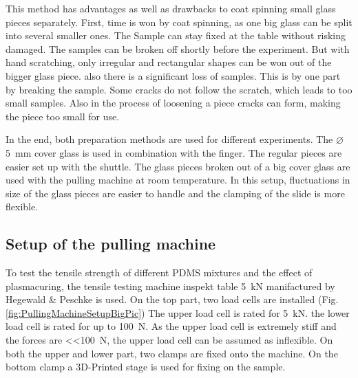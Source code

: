 This method has advantages as well as drawbacks to coat spinning small glass pieces separately. First, time is won by coat spinning, as one big glass can be split into several smaller ones. The Sample can stay fixed at the table without risking damaged. The samples can be broken off shortly before the experiment. But with hand scratching, only irregular and rectangular shapes can be won out of the bigger glass piece. also there is a significant loss of samples. This is by one part by breaking the sample. Some cracks do not follow the scratch, which leads to too small samples. Also in the process of loosening a piece cracks can form, making the piece too small for use.

In the end, both preparation methods are used for different experiments. The $\varnothing$\SI{5}{\milli\meter} cover glass is used in combination with the finger. The regular pieces are easier set up with the shuttle. The glass pieces broken out of a big cover glass are used with the pulling machine at room temperature. In this setup, fluctuations in size of the glass pieces are easier to handle and the clamping of the slide is more flexible. %

\subsection{Setup of the pulling machine}

To test the tensile strength of different PDMS mixtures and the effect of plasmacuring, the tensile testing machine inspekt table \SI{5}{\kilo\newton} manifactured by Hegewald \& Peschke is used. On the top part, two load cells are installed (Fig. \ref{fig:PullingMachineSetupBigPic}) The upper load cell is rated for \SI{5}{\kilo\newton}. the lower load cell is rated for up to \SI{100}{\newton}. As the upper load cell is extremely stiff and the forces are \SI{<<100}{\newton}, the upper load cell can be assumed as inflexible. On both the upper and lower part, two clamps are fixed onto the machine. On the bottom clamp a 3D-Printed stage is used for fixing on the sample.


